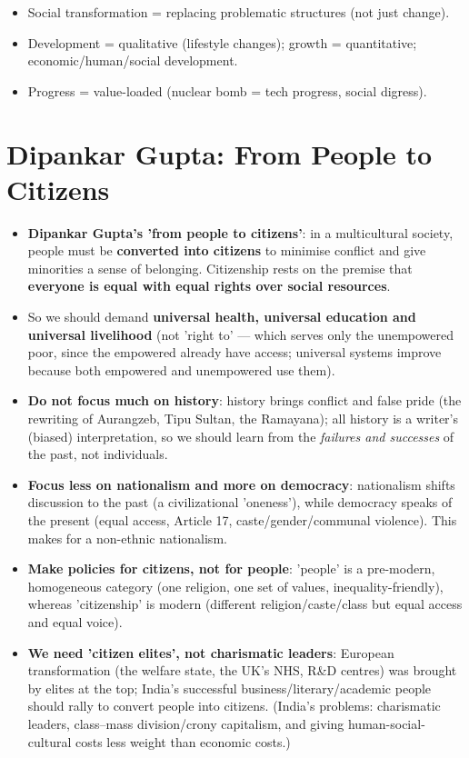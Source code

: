 \begin{QuickRevision}
\begin{itemize}
\item Social transformation = replacing problematic structures (not just change).
\item Development = qualitative (lifestyle changes); growth = quantitative; economic/human/social development.
\item Progress = value-loaded (nuclear bomb = tech progress, social digress).
\end{itemize}
\end{QuickRevision}

\section{Dipankar Gupta: From People to Citizens}

\begin{KeyConcept}
\begin{itemize}
\item \textbf{Dipankar Gupta's 'from people to citizens'}: in a multicultural society, people must be \textbf{converted into citizens} to minimise conflict and give minorities a sense of belonging. Citizenship rests on the premise that \textbf{everyone is equal with equal rights over social resources}.
\item So we should demand \textbf{universal health, universal education and universal livelihood} (not 'right to' --- which serves only the unempowered poor, since the empowered already have access; universal systems improve because both empowered and unempowered use them).
\item \textbf{Do not focus much on history}: history brings conflict and false pride (the rewriting of Aurangzeb, Tipu Sultan, the Ramayana); all history is a writer's (biased) interpretation, so we should learn from the \emph{failures and successes} of the past, not individuals.
\item \textbf{Focus less on nationalism and more on democracy}: nationalism shifts discussion to the past (a civilizational 'oneness'), while democracy speaks of the present (equal access, Article 17, caste/gender/communal violence). This makes for a non-ethnic nationalism.
\item \textbf{Make policies for citizens, not for people}: 'people' is a pre-modern, homogeneous category (one religion, one set of values, inequality-friendly), whereas 'citizenship' is modern (different religion/caste/class but equal access and equal voice).
\item \textbf{We need 'citizen elites', not charismatic leaders}: European transformation (the welfare state, the UK's NHS, R\&D centres) was brought by elites at the top; India's successful business/literary/academic people should rally to convert people into citizens. (India's problems: charismatic leaders, class--mass division/crony capitalism, and giving human-social-cultural costs less weight than economic costs.)
\end{itemize}
\end{KeyConcept}

